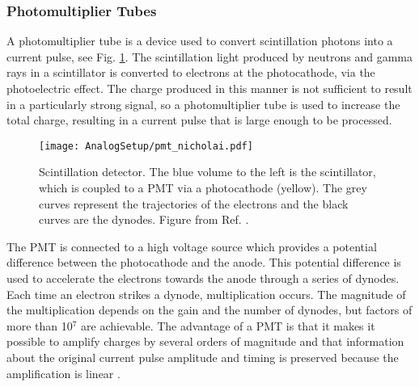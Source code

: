 \documentclass[main.tex]{subfiles}
\begin{document}
\subsubsection{Photomultiplier Tubes}
A photomultiplier tube is a device used to convert scintillation photons into a current pulse, see Fig. \ref{fig:pmt}. The scintillation light produced by neutrons and gamma rays in a scintillator is converted to electrons at the photocathode, via the photoelectric effect. The charge produced in this manner is not sufficient to result in a particularly strong signal, so a photomultiplier tube is used to increase the total charge, resulting in a current pulse that is large enough to be processed. 

\begin{figure}[ht]
	\centering
    	\texttt{[image: AnalogSetup/pmt\_nicholai.pdf]}
        \caption[Scintillation detector]{Scintillation detector. The blue volume to the left is the scintillator, which is coupled to a PMT via a photocathode (yellow). The grey curves represent the trajectories of the electrons and the black curves are the dynodes. Figure from Ref. \cite{Mauritzsson}.}
	    \label{fig:pmt} 
\end{figure}

The PMT is connected to a high voltage source which provides a potential difference between the photocathode and the anode. This potential difference is used to accelerate the electrons towards the anode through a series of dynodes. Each time an electron strikes a dynode, multiplication occurs. 
The magnitude of the multiplication depends on the gain and the number of dynodes, but factors of more than 10$^\text{7}$ are achievable. 
The advantage of a PMT is that it makes it possible to amplify charges by several orders of magnitude and that information about the original current pulse amplitude and timing is preserved because the amplification is linear \cite{Leo}.
\end{document}
